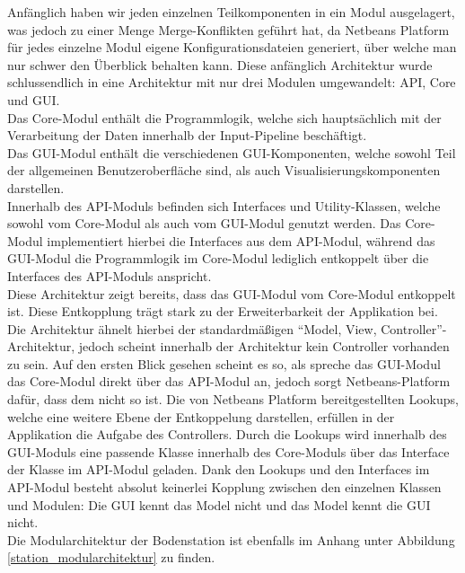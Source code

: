Anfänglich haben wir jeden einzelnen Teilkomponenten in ein Modul ausgelagert, was jedoch zu einer Menge Merge-Konflikten geführt hat, da Netbeans Platform für jedes einzelne Modul eigene Konfigurationsdateien generiert, über welche man nur schwer den Überblick behalten kann. Diese anfänglich Architektur wurde schlussendlich in eine Architektur mit nur drei Modulen umgewandelt: API, Core und GUI. \\
Das Core-Modul enthält die Programmlogik, welche sich hauptsächlich mit der Verarbeitung der Daten innerhalb der Input-Pipeline beschäftigt. \\
Das GUI-Modul enthält die verschiedenen GUI-Komponenten, welche sowohl Teil der allgemeinen Benutzeroberfläche sind, als auch Visualisierungskomponenten darstellen. \\
Innerhalb des API-Moduls befinden sich Interfaces und Utility-Klassen, welche sowohl vom Core-Modul als auch vom GUI-Modul genutzt werden. Das Core-Modul implementiert hierbei die Interfaces aus dem API-Modul, während das GUI-Modul die Programmlogik im Core-Modul lediglich entkoppelt über die Interfaces des API-Moduls anspricht. \\
Diese Architektur zeigt bereits, dass das GUI-Modul vom Core-Modul entkoppelt ist. Diese Entkopplung trägt stark zu der Erweiterbarkeit der Applikation bei. Die Architektur ähnelt hierbei der standardmäßigen ``Model, View, Controller''-Architektur, jedoch scheint innerhalb der Architektur kein Controller vorhanden zu sein. Auf den ersten Blick gesehen scheint es so, als spreche das GUI-Modul das Core-Modul direkt über das API-Modul an, jedoch sorgt Netbeans-Platform dafür, dass dem nicht so ist. Die von Netbeans Platform bereitgestellten Lookups, welche eine weitere Ebene der Entkoppelung darstellen, erfüllen in der Applikation die Aufgabe des Controllers. Durch die Lookups wird innerhalb des GUI-Moduls eine passende Klasse innerhalb des Core-Moduls über das Interface der Klasse im API-Modul geladen. Dank den Lookups und den Interfaces im API-Modul besteht absolut keinerlei Kopplung zwischen den einzelnen Klassen und Modulen: Die GUI kennt das Model nicht und das Model kennt die GUI nicht. \\
Die Modularchitektur der Bodenstation ist ebenfalls im Anhang unter Abbildung \ref{station_modularchitektur} zu finden.

